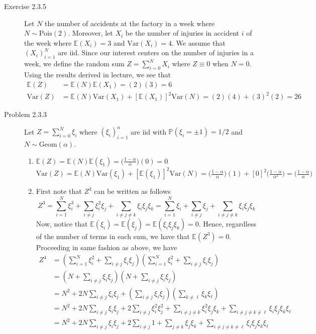 \documentclass[12pt]{article}  %
\newcommand{\E}{{\mathbb{E}}}
\newcommand{\V}{{\text{Var}}}
\newcommand{\prob}{{\mathbb{P}}}
\begin{document}
\begin{description}
\item[Exercise 2.3.5]
Let $N$ the number of accidents at the factory in a week where $N\sim\text{Pois}(2)$. Moreover, let $X_i$ be the number of injuries in accident $i$ of the week where $\E(X_i) = 3$ and $\V(X_i) = 4$. We assume that $(X_i)_{i=1}^{N}$ are iid. Since our interest centers on the number of injuries in a week, we define the random sum $Z = \sum_{i = 0}^NX_i$ where $Z \equiv 0$ when $N=0$. Using the results derived in lecture, we see that 
\begin{align*}\E(Z) &= \E(N)\E(X_1) = (2)(3) = 6\\
\V(Z) &= \E(N)\V(X_1) + [\E(X_1)]^2\V(N) = (2)(4) + (3)^2(2) = 26
\end{align*}
\item[Problem 2.3.3] Let $Z = \sum_{i=0}^{N}\xi_i $ where $(\xi_i)_{i=1}^n$ are iid with $\prob(\xi_i =\pm 1) = 1/2$ and $N\sim\text{Geom}(\alpha)$. 
	\begin{enumerate}[a]
		\item $\E(Z) = \E(N)\E(\xi_1) = \big(\frac{1-\alpha}{\alpha}\big)(0) = 0$\\ $\V(Z) = \E(N)\V(\xi_1) + [\E(\xi_1)]^2\V(N) = \big(\frac{1-\alpha}{\alpha}\big)(1) + [0]^2\big(\frac{1-\alpha}{\alpha^2}\big) = \big(\frac{1-\alpha}{\alpha}\big)$
		\item First note that $Z^3$ can be written as follows $$Z^3 = \sum_{i = 1}^N\xi_i^3 + \sum_{i \neq j }\xi_i^2\xi_j + \sum_{i \neq j \neq k }\xi_i\xi_j\xi_k =  \sum_{i = 1}^N\xi_i + \sum_{i \neq j }\xi_j + \sum_{i \neq j \neq k }\xi_i\xi_j\xi_k$$ Now, notice that $\E(\xi_i) = \E(\xi_j) = \E(\xi_i\xi_j\xi_k) = 0$. Hence, regardless of the number of terms in each sum, we have that $\E(Z^3) = 0$. Proceeding in same fashion as above, we have 
		\begin{align*}
		Z^4 &= \left(\sum_{i=1}^N\xi_i^2 + \sum_{i\neq j}\xi_i\xi_j\right)\left(\sum_{i=1}^N\xi_i^2 + \sum_{i\neq j}\xi_i\xi_j\right)\\
		&= \left(N + \sum_{i\neq j}\xi_i\xi_j\right)\left(N + \sum_{i\neq j}\xi_i\xi_j\right)\\
		&= N^2 + 2N\sum_{i\neq j}\xi_i\xi_j + \left(\sum_{i\neq j}\xi_i\xi_j\right)\left(\sum_{k\neq \ell}\xi_k\xi_{\ell}\right)\\
		&= N^2 + 2N\sum_{i\neq j}\xi_i\xi_j + 2\sum_{i\neq j}\xi_i^2\xi_j^2+ \sum_{i\neq j\neq k }\xi_i^2\xi_j\xi_k + \sum_{i\neq j \neq k\neq \ell}\xi_i\xi_j\xi_k\xi_{\ell}\\
		&= N^2 + 2N\sum_{i\neq j}\xi_i\xi_j + 2\sum_{i\neq j}1+ \sum_{j\neq k }\xi_j\xi_k + \sum_{i\neq j \neq k\neq \ell}\xi_i\xi_j\xi_k\xi_{\ell}\\

\end{align*}
\end{enumerate}
\end{description}
\end{document}
